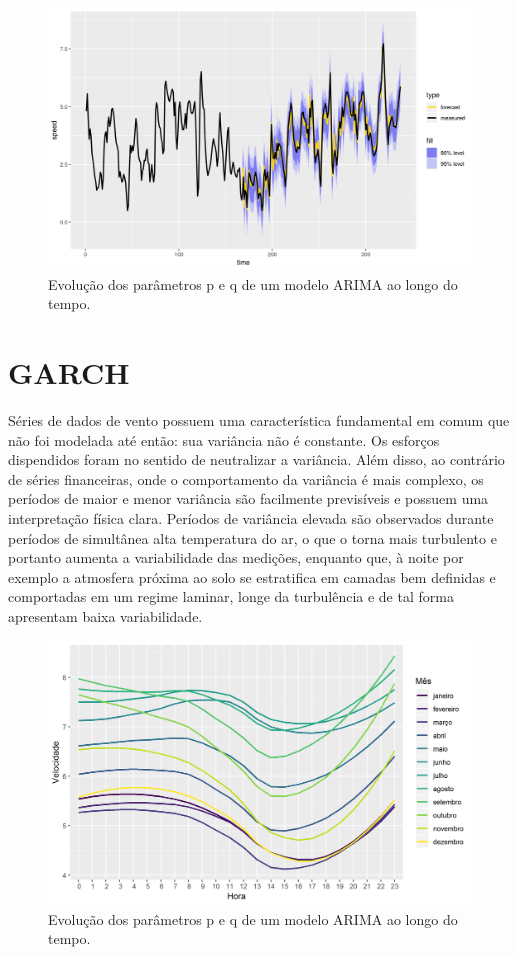 \documentclass[
	12pt,				%
	openright,			%
	oneside,			%
	a4paper,			%
	english,			%
	french,				%
	spanish,			%
	brazil				%
	]{abntex2}
\begin{document}

\begin{figure}[h]
    \centering
	\includegraphics[width=\textwidth]{var_result}
	\caption{Evolução dos parâmetros p e q de um modelo ARIMA ao longo do tempo.}
\end{figure}
\FloatBarrier

\chapter{GARCH}

Séries de dados de vento possuem uma característica fundamental em comum que não foi modelada até então: sua variância não é constante. Os esforços dispendidos foram no sentido de neutralizar a variância. Além disso, ao contrário de séries financeiras, onde o comportamento da variância é mais complexo, os períodos de maior e menor variância são facilmente previsíveis e possuem uma interpretação física clara. Períodos de variância elevada são observados durante períodos de simultânea alta temperatura do ar, o que o torna mais turbulento e portanto aumenta a variabilidade das medições, enquanto que, à noite por exemplo a atmosfera próxima ao solo se estratifica em camadas bem definidas e comportadas em um regime laminar, longe da turbulência e de tal forma apresentam baixa variabilidade.

\begin{figure}[h]
    \centering
	\includegraphics[width=\textwidth]{diurnal}
	\caption{Evolução dos parâmetros p e q de um modelo ARIMA ao longo do tempo.}
\end{figure}
\FloatBarrier
\end{document}
